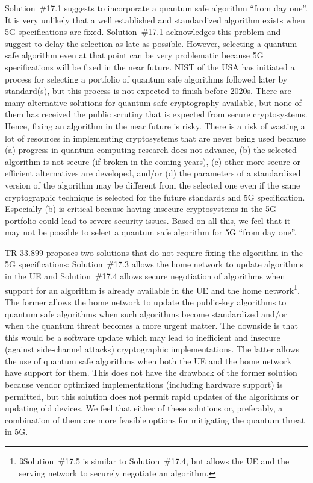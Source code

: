 \documentclass[12pt]{llncs}
\begin{document}
Solution~\#17.1 suggests to incorporate a quantum safe algorithm ``from day one''. It is very unlikely that a well established and standardized algorithm exists when 5G specifications are fixed. Solution~\#17.1 acknowledges this problem and suggest to delay the selection as late as possible. However, selecting a quantum safe algorithm even at that point can be very problematic because 5G specifications will be fixed in the near future. NIST of the USA has initiated a process for selecting a portfolio of quantum safe algorithms followed later by standard(s), but this process is not expected to finish before 2020s. There are many alternative solutions for quantum safe cryptography available, but none of them has received the public scrutiny that is expected from secure cryptosystems. Hence, fixing an algorithm in the near future is risky. There is a risk of wasting a lot of resources in implementing cryptosystems that are never being used because (a) progress in quantum computing research does not advance, (b) the selected algorithm is not secure (if broken in the coming years), (c) other more secure or efficient alternatives are developed, and/or (d) the parameters of a standardized version of the algorithm may be different from the selected one even if the same cryptographic technique is selected for the future standards and 5G specification. Especially (b) is critical because having insecure cryptosystems in the 5G portfolio could lead to severe security issues. Based on all this, we feel that it may not be possible to select a quantum safe algorithm for 5G ``from day one''.

TR 33.899 proposes two solutions that do not require fixing the algorithm in the 5G specifications: Solution~\#17.3 allows the home network to update algorithms in the UE and Solution~\#17.4 allows secure negotiation of algorithms when support for an algorithm is already available in the UE and the home network\footnote{ßSolution~\#17.5 is similar to Solution~\#17.4, but allows the UE and the serving network to securely negotiate an algorithm.}. The former allows the home network to update the public-key algorithms to quantum safe algorithms when such algorithms become standardized and/or when the quantum threat becomes a more urgent matter. The downside is that this would be a software update which may lead to inefficient and insecure (against side-channel attacks) cryptographic implementations. The latter allows the use of quantum safe algorithms when both the UE and the home network have support for them. This does not have the drawback of the former solution because vendor optimized implementations (including hardware support) is permitted, but this solution does not permit rapid updates of the algorithms or updating old devices. We feel that either of these solutions or, preferably, a combination of them are more feasible options for mitigating the quantum threat in 5G.
\end{document}
